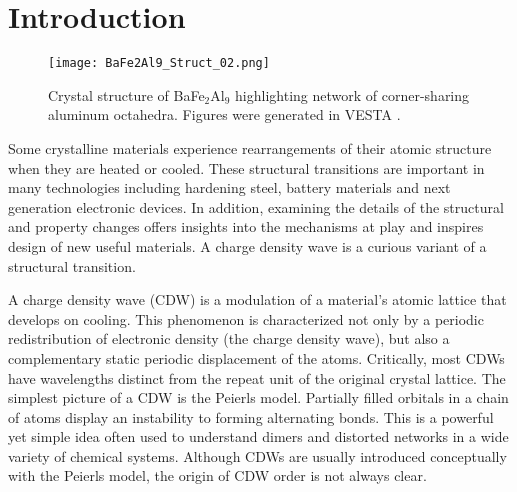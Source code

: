 \documentclass[journal=cmatex,manuscript=article]{achemso}
\begin{document}
\section{Introduction}
\label{sec:Intro}


\begin{figure}
\texttt{[image: BaFe2Al9\_Struct\_02.png]}
\caption{\label{fig:Structure} 
	Crystal structure of BaFe$_2$Al$_9$ highlighting network of corner-sharing aluminum octahedra. Figures were generated in VESTA \cite{Momma2011_Vesta3}.
}
\end{figure}

Some crystalline materials experience rearrangements of their atomic structure when they are heated or cooled. These structural transitions are important in many technologies including hardening steel\cite{Bhadeshia2006_Steels}, battery materials\cite{Orikasa2013_LiFePO4-FePO4-PhaseChangeBatteries,Yahia2013_LiCoO2-PhaseTransition} and next generation electronic devices\cite{Tomforde2011_Ge-Sb-Te-PhaseChangeThinFilms,Bischoff2017_PhaseEngineeringNbSe2,Meddar2012_IncrePhaseTransTempMultiferroicMnWO4}. In addition, examining the details of the structural and property changes offers insights into the mechanisms at play and inspires design of new useful materials. A charge density wave is a curious variant of a structural transition.


A charge density wave (CDW) is a modulation of a material's atomic lattice that develops on cooling.
This phenomenon is characterized not only by a periodic redistribution of electronic density (the charge density wave), but also a complementary static periodic displacement of the atoms.
Critically, most CDWs have wavelengths distinct from the repeat unit of the original crystal lattice.\cite{Gruner1994_DensityWavesInSolids}
The simplest picture of a CDW is the Peierls model. Partially filled orbitals in a chain of atoms display an instability to forming alternating bonds.\cite{Burdett1995_ChemicalBondingInSolids,Gruner1994_DensityWavesInSolids,Hoffmann1987_ChemistryPhysicsMeetInTheSolidState} This is a powerful yet simple idea often used to understand dimers and distorted networks in a wide variety of chemical systems.\cite{OwensBaird2019_NiP2-polymorphs,Kobayashi2019_TrimerFormation1T-CrSe2,Alemany2009_HostGuestInteractionsCa7N4Mx}
Although CDWs are usually introduced conceptually with the Peierls model, the origin of CDW order is not always clear.\cite{Gruner1994_DensityWavesInSolids,Zhu2017_MisconceptionsChargeDensityWaves,Gruener1988_DynamicsOfCDWs,Johannes2008_NestingAndChargeDensityWaves}
\end{document}
